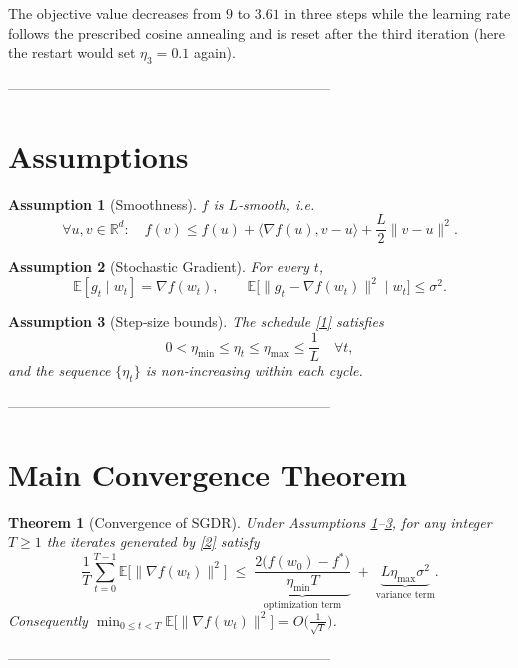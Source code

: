 \documentclass{article}
\newtheorem{theorem}{Theorem}
\newtheorem{assumption}{Assumption}
\newcommand{\EE}{\mathbb{E}}
\newcommand{\RR}{\mathbb{R}}
\begin{document}
The objective value decreases from $9$ to $3.61$ in three steps while the
learning rate follows the prescribed cosine annealing and is reset after the
third iteration (here the restart would set $\eta_{3}=0.1$ again).

---------------------------------------------------------------------

\section*{Assumptions}
\begin{assumption}[Smoothness]\label{as:smooth}
$f$ is $L$‑smooth, i.e.
\[
\forall u,v\in\RR^{d}:\quad
f(v)\le f(u)+\langle\nabla f(u),v-u\rangle+\frac{L}{2}\|v-u\|^{2}.
\tag{A1}
\]
\end{assumption}

\begin{assumption}[Stochastic Gradient]\label{as:stoch}
For every $t$,
\[
\EE[g_{t}\mid w_{t}]=\nabla f(w_{t}),\qquad
\EE\!\big[\|g_{t}-\nabla f(w_{t})\|^{2}\mid w_{t}\big]\le\sigma^{2}.
\tag{A2}
\]
\end{assumption}

\begin{assumption}[Step‑size bounds]\label{as:steps}
The schedule \eqref{1} satisfies
\[
0<\eta_{\min}\le\eta_{t}\le\eta_{\max}\le\frac{1}{L}\quad\forall t,
\tag{A3}
\]
and the sequence $\{\eta_{t}\}$ is \emph{non‑increasing} within each cycle.
\end{assumption}

---------------------------------------------------------------------

\section*{Main Convergence Theorem}
\begin{theorem}[Convergence of SGDR]\label{thm:sgdr}
Under Assumptions \ref{as:smooth}–\ref{as:steps}, for any integer $T\ge1$
the iterates generated by \eqref{2} satisfy
\[
\frac{1}{T}\sum_{t=0}^{T-1}\EE\!\big[\|\nabla f(w_{t})\|^{2}\big]
\;\le\;
\underbrace{\frac{2\big(f(w_{0})-f^{*}\big)}{\eta_{\min}T}}_{\displaystyle
\text{optimization term}}
\;+\;
\underbrace{L\eta_{\max}\sigma^{2}}_{\displaystyle\text{variance term}}.
\tag{3}
\]
Consequently $\displaystyle\min_{0\le t<T}\EE\!\big[\|\nabla f(w_{t})\|^{2}\big]
=O\!\big(\tfrac{1}{\sqrt{T}}\big)$.
\end{theorem}

---------------------------------------------------------------------
\end{document}
